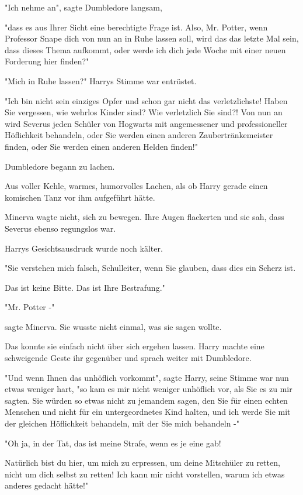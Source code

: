 {"Ich nehme an", sagte Dumbledore langsam,

"dass es aus Ihrer Sicht eine berechtigte Frage ist. Also, Mr. Potter, wenn Professor Snape dich von nun an in Ruhe lassen soll, wird das das letzte Mal sein, dass dieses Thema aufkommt, oder werde ich dich jede Woche mit einer neuen Forderung hier finden?"

"Mich in Ruhe lassen?" Harrys Stimme war entrüstet.

"Ich bin nicht sein einziges Opfer und schon gar nicht das verletzlichste! Haben Sie vergessen, wie wehrlos Kinder sind? Wie verletzlich Sie sind?! Von nun an wird Severus jeden Schüler von Hogwarts mit angemessener und professioneller Höflichkeit behandeln, oder Sie werden einen anderen Zaubertränkemeister finden, oder Sie werden einen anderen Helden finden!"

Dumbledore begann zu lachen.

Aus voller Kehle, warmes, humorvolles Lachen, als ob Harry gerade einen komischen Tanz vor ihm aufgeführt hätte.

Minerva wagte nicht, sich zu bewegen. Ihre Augen flackerten und sie sah, dass Severus ebenso regungslos war.

Harrys Gesichtsausdruck wurde noch kälter.

"Sie verstehen mich falsch, Schulleiter, wenn Sie glauben, dass dies ein Scherz ist.

Das ist keine Bitte. Das ist Ihre Bestrafung."

"Mr. Potter -"

sagte Minerva. Sie wusste nicht einmal, was sie sagen wollte.

Das konnte sie einfach nicht über sich ergehen lassen. Harry machte eine schweigende Geste ihr gegenüber und sprach weiter mit Dumbledore.

"Und wenn Ihnen das unhöflich vorkommt", sagte Harry, seine Stimme war nun etwas weniger hart, "so kam es mir nicht weniger unhöflich vor, als Sie es zu mir sagten. Sie würden so etwas nicht zu jemandem sagen, den Sie für einen echten Menschen und nicht für ein untergeordnetes Kind halten, und ich werde Sie mit der gleichen Höflichkeit behandeln, mit der Sie mich behandeln -"

"Oh ja, in der Tat, das ist meine Strafe, wenn es je eine gab!

Natürlich bist du hier, um mich zu erpressen, um deine Mitschüler zu retten, nicht um dich selbst zu retten! Ich kann mir nicht vorstellen, warum ich etwas anderes gedacht hätte!"

}
